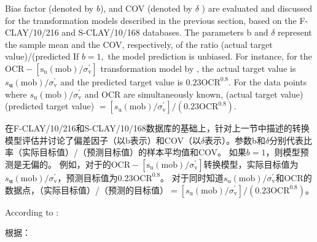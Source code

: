 \begin{ParaColumn}
    \CrossColumnText{
        
    }
    

    Bias factor (denoted by $b$), and COV (denoted by $\delta$ ) are evaluated and discussed for the transformation models described in the previous section, based on the F-CLAY/10/216 and S-CLAY/10/168 databases. The parameters b and $\delta$ represent the sample mean and the COV, respectively, of the ratio (actual target value)/(predicted If $b=1,$ the model prediction is unbiased. For instance, for the $\mathrm{OCR}-\left[\mathrm{s}_{\mathrm{u}}(\mathrm{mob}) / \sigma_{\mathrm{v}}^{\prime}\right]$ transformation model by \citet{Jamiolkowski198557}, the actual target value is $s_{\mathbf{u}}(\mathrm{mob}) / \sigma_{\mathrm{v}}^{\prime}$ and the predicted target value is $0.23\mathrm{OCR}^{0.8}$. For the data points where $s_{\mathrm{u}}(\mathrm{mob}) / \sigma_{\mathrm{v}}^{\prime}$ and OCR are simultaneously known, (actual target value) (predicted target value) $=\left[s_{\mathrm{u}}(\mathrm{mob}) / \sigma_{\mathrm{v}}^{\prime}\right] /\left(0.23 \mathrm{OCR}^{0.8}\right)$.

    \switchcolumn

    在F-CLAY/10/216和S-CLAY/10/168数据库的基础上，针对上一节中描述的转换模型评估并讨论了偏差因子（以b表示）和COV（以$\delta$表示）。参数b和$\delta$分别代表比率（实际目标值）/（预测目标值）的样本平均值和COV。 如果$b = 1$，则模型预测是无偏的。 例如，对于\citet{Jamiolkowski198557}的$\mathrm{OCR}-\left[\mathrm{s}_{\mathrm{u}}(\mathrm{mob}) / \sigma_{\mathrm{v}}^{\prime}\right]$转换模型，实际目标值为$s_{\mathbf{u}}(\mathrm{mob}) / \sigma_{\mathrm{v}}^{\prime}$，预测目标值为$0.23\mathrm{OCR}^{0.8}$。 对于同时知道$s_{\mathrm{u}}(\mathrm{mob}) / \sigma_{\mathrm{v}}^{\prime}$和OCR的数据点，（实际目标值）/（预测的目标值）$=\left[s_{\mathrm{u}}(\mathrm{mob}) / \sigma_{\mathrm{v}}^{\prime}\right] /\left(0.23 \mathrm{OCR}^{0.8}\right)$。

    \switchcolumn*

    According to \citet{Ching2014663}:

    \switchcolumn

    根据\citet{Ching2014663}：



\end{ParaColumn}
